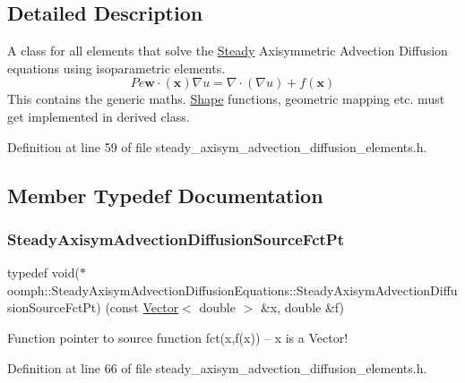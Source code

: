 \subsection{Detailed Description}
A class for all elements that solve the \hyperlink{classoomph_1_1Steady}{Steady} Axisymmetric Advection Diffusion equations using isoparametric elements. \[ Pe \mathbf{w}\cdot(\mathbf{x}) \nabla u = \nabla \cdot \left( \nabla u \right) + f(\mathbf{x}) \] This contains the generic maths. \hyperlink{classoomph_1_1Shape}{Shape} functions, geometric mapping etc. must get implemented in derived class. 

Definition at line 59 of file steady\+\_\+axisym\+\_\+advection\+\_\+diffusion\+\_\+elements.\+h.



\subsection{Member Typedef Documentation}
\mbox{\label{classoomph_1_1SteadyAxisymAdvectionDiffusionEquations_a1a8121ed2ce92dc69aa85c71975489d0}} 
\subsubsection{\texorpdfstring{Steady\+Axisym\+Advection\+Diffusion\+Source\+Fct\+Pt}{SteadyAxisymAdvectionDiffusionSourceFctPt}}
{\footnotesize\ttfamily typedef void($\ast$ oomph\+::\+Steady\+Axisym\+Advection\+Diffusion\+Equations\+::\+Steady\+Axisym\+Advection\+Diffusion\+Source\+Fct\+Pt) (const \hyperlink{classoomph_1_1Vector}{Vector}$<$ double $>$ \&x, double \&f)}



Function pointer to source function fct(x,f(x)) -- x is a Vector! 



Definition at line 66 of file steady\+\_\+axisym\+\_\+advection\+\_\+diffusion\+\_\+elements.\+h.

